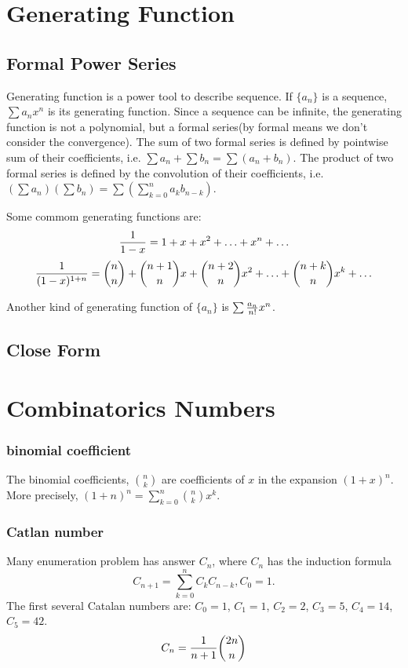\section{Generating Function}
\subsection{Formal Power Series}
Generating function is a power tool to describe sequence. If $\{a_n\}$ is a sequence,
$\sum a_n x^n$ is its generating function. Since a sequence can be infinite, the generating
function is not a polynomial, but a formal series(by formal means we don't consider the convergence).
The sum of two formal series is defined by pointwise sum of their coefficients,
i.e. $\sum a_n + \sum b_n = \sum (a_n+b_n)$.
The product of two formal series is defined by the convolution of their coefficients,
i.e. $(\sum a_n)(\sum b_n) = \sum (\sum_{k=0}^{n} a_k b_{n-k})$.

Some commom generating functions are:
$${1\over{1-x}} = 1 + x + x^2 + \ldots + x^n + \ldots$$
$${1\over{(1-x)^{1+n}}} = {n\choose n} + {n+1\choose n}x + {n+2\choose n}x^2 + \ldots + {n + k\choose n}x^k + \ldots$$

Another kind of generating function of $\{a_n\}$ is $\sum {a_n\over n!} x^n$.

\subsection{Close Form}


\section{Combinatorics Numbers}
\subsubsection{binomial coefficient}
The binomial coefficients, $n\choose k$ are coefficients of $x$ in the expansion $(1+x)^n$.
More precisely, $(1+n)^n=\sum_{k=0}^n {n\choose k}x^k$.

\subsubsection{Catlan number}
Many enumeration problem has answer $C_n$,
where $C_n$ has the induction formula
$$C_{n+1} = \sum_{k=0}^n C_k C_{n-k}, C_0=1.$$
The first several Catalan numbers are:
$C_0=1$, $C_1=1$, $C_2=2$, $C_3=5$, $C_4=14$, $C_5=42$.
$$C_n={1 \over {n + 1}} {2n \choose n}$$

